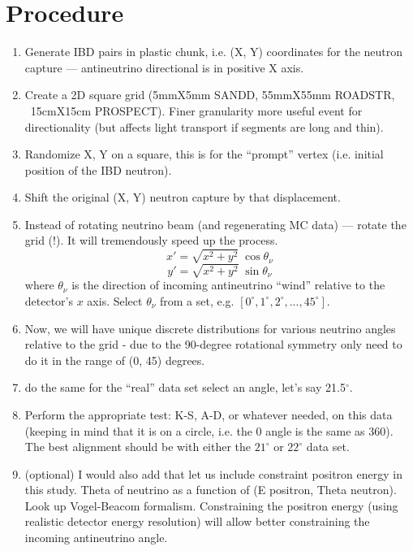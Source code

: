\section{Procedure}

\begin{enumerate}
    \item Generate IBD pairs  in plastic chunk, i.e. (X, Y) coordinates for the neutron capture --- antineutrino directional is in positive X axis.
    \item Create a 2D square grid (5mmX5mm SANDD, 55mmX55mm ROADSTR, ~15cmX15cm PROSPECT). Finer granularity more useful event for directionality (but affects light transport if segments are long and thin).
    \item Randomize X, Y on a square, this is for the “prompt” vertex (i.e. initial position of the IBD neutron).
    \item Shift the original (X, Y) neutron capture by that displacement.
    \item  Instead of rotating neutrino beam (and regenerating MC data) --- rotate the grid (!). It will tremendously speed up the process.
   \begin{equation}
       x' = \sqrt{x^2 + y^2} \; \cos \theta_\nu
   \end{equation}
   \begin{equation}
       y' = \sqrt{x^2 + y^2} \; \sin \theta_\nu
   \end{equation}
   where $\theta_\nu$ is the direction of incoming antineutrino ``wind'' relative to the detector's $x$ axis. Select $\theta_\nu$ from a set, e.g. $[0^\circ, 1^\circ, 2^\circ, ..., 45^\circ  ]$.
   \item  Now, we will have unique discrete distributions for various neutrino angles relative to the grid - due to the 90-degree rotational symmetry only need to do it in the range of (0, 45) degrees.
   \item do the same for the ``real'' data set select an angle, let's say 21.5$^\circ$.
   \item  Perform the appropriate test: K-S, A-D, or whatever needed, on this data (keeping in mind that it is on a circle, i.e. the 0 angle is the same as 360). The best alignment should be with either the $21^\circ$ or $22^\circ$ data set.
   \item  (optional) I would also add that let us include constraint positron energy in this study. 
Theta of neutrino as a function of (E positron, Theta neutron). Look up Vogel-Beacom formalism. 
Constraining the positron energy (using realistic detector energy resolution) will allow better constraining the incoming antineutrino angle. 
\end{enumerate}

